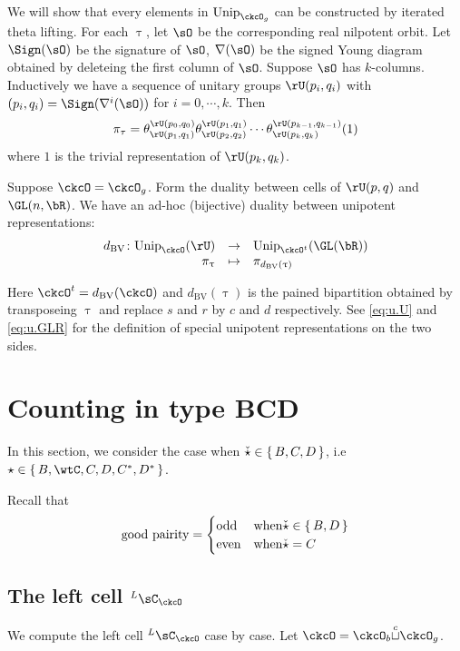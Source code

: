 \documentclass[12pt,a4paper]{amsart}
\newcommand{\sgn}{\operatorname{sgn}}
\def\DD{\nabla}
\numberwithin{equation}{section}
\theoremstyle{remark}
\def\Unip{\mathrm{Unip}}
\def\dBV{d_{\mathrm{BV}}}
\def\DD{\nabla}
\def\LC{{}^L\sC}
\def\cupcol{{\stackrel{c}{\sqcup}}}
\begin{document}
We will show that every elements in $\Unip_{\ckcO_g}$ can be constructed by iterated theta lifting.  
For each $\uptau$, let $\sO$ be the corresponding real nilpotent orbit. Let
$\Sign(\sO)$ be the signature of $\sO$, $\DD(\sO)$ be the signed Young diagram
obtained by deleteing the first column of $\sO$. 
Suppose $\sO$ has $k$-columns. Inductively we have a sequence of unitary groups
$\rU(p_i,q_i)$ with $(p_i,q_i) = \Sign(\DD^i(\sO))$ for $i=0, \cdots, k$. Then 
\begin{equation}\label{eq:u.U}
  \pi_\tau = \theta^{\rU(p_0,q_0)}_{\rU(p_1,q_1)} \theta^{\rU(p_1,q_1)}_{\rU(p_2,q_2)}\cdots   
\theta^{\rU(p_{k-1},q_{k-1})}_{\rU(p_k,q_k)}(1)
\end{equation}
where $1$ is the trivial representation of $\rU(p_k,q_k)$. 


Suppose $\ckcO = \ckcO_g$. Form the duality between cells of $\rU(p,q)$ and
$\GL(n,\bR)$. We have an ad-hoc (bijective) duality between unipotent
representations: 
\[
  \begin{array}{rcl}
 \dBV\colon \Unip_{\ckcO}(\rU)& \rightarrow &\Unip_{\ckcO^t}(\GL(\bR)) \\
 \pi_\uptau &\mapsto& \pi_{\dBV(\uptau)} \\ 
  \end{array}
\]

Here $\ckcO^t = \dBV(\ckcO)$ and $\dBV(\uptau)$ is the pained bipartition
obtained by transposeing $\uptau$ and replace $s$ and $r$ by $c$ and $d$
respectively. See \eqref{eq:u.U} and \eqref{eq:u.GLR} for the definition of
special unipotent representations on the two sides.  

\section{Counting in type BCD}
\def\tsgn{\widetilde{\sgn}}
\def\PBP{\mathsf{PBP}}

\def\ckstar{{\check \star}}

In this section, we consider the case when $\ckstar \in \set{B,C,D}$, i.e
$\star \in \set{B,\wtC, C,D,C^{*}, D^{*}}$.

Recall that
\[
  \text{good pairity} =
\begin{cases}
 \text{odd} & \text{when} \ckstar\in \set{B,D}\\
 \text{even} & \text{when} \ckstar = C\\
\end{cases}
\]


\subsection{The left cell $\LC_{\ckcO}$}
We compute the left cell $\LC_{\ckcO}$ case by case.
Let $\ckcO = \ckcO_{b}\cupcol \ckcO_{g}$.
\end{document}

